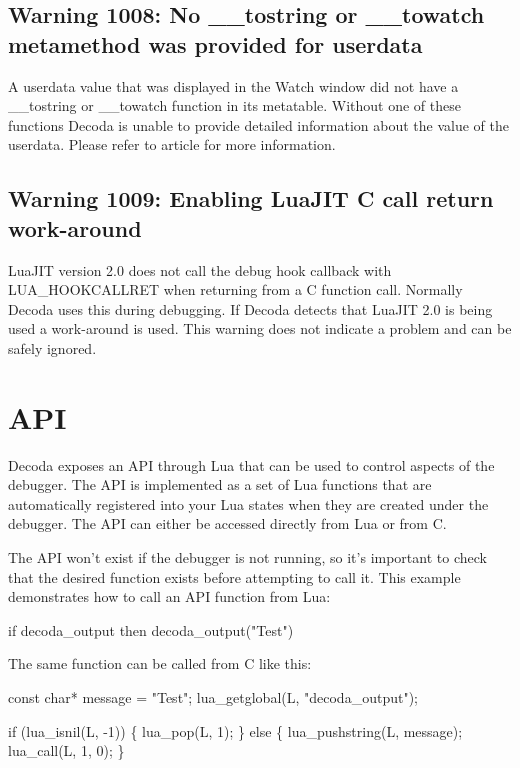 \section{Warning 1008: No __tostring or __towatch metamethod was provided for userdata}\label{warning_1008}

A userdata value that was displayed in the Watch window did not have a __tostring or __towatch function
in its metatable.  Without one of these functions Decoda is unable to provide detailed information about
the value of the userdata. Please refer to  article for more information.

\section{Warning 1009: Enabling LuaJIT C call return work-around}\label{warning_1009}

LuaJIT version 2.0 does not call the debug hook callback with LUA_HOOKCALLRET when returning from a C
function call. Normally Decoda uses this during debugging. If Decoda detects that LuaJIT 2.0 is being
used a work-around is used. This warning does not indicate a problem and can be safely ignored.

\chapter{API}\label{api}

Decoda exposes an API through Lua that can be used to control aspects of the debugger. The API is
implemented as a set of Lua functions that are automatically registered into your Lua states when
they are created under the debugger.  The API can either be accessed directly from Lua or from C.

The API won't exist if the debugger is not running, so it's important to check that the desired
function exists before attempting to call it.  This example demonstrates how to call an API function
from Lua:

{\verbatim if decoda_output then decoda_output("Test") }

The same function can be called from C like this:

{\verbatim const char* message = "Test";
lua_getglobal(L, "decoda_output");

if (lua_isnil(L, -1))
\{
    lua_pop(L, 1);
\}
else
\{
    lua_pushstring(L, message);
    lua_call(L, 1, 0);
\}
}

